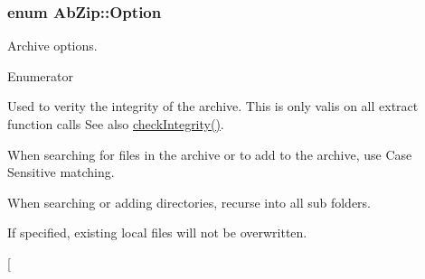 \subsubsection[{\texorpdfstring{Option}{Option}}]{\setlength{\rightskip}{0pt plus 5cm}enum {\bf Ab\+Zip\+::\+Option}}\hypertarget{class_ab_zip_a9c4f57d6b8d9a449c2eb6c4d4e53c9d5}{}\label{class_ab_zip_a9c4f57d6b8d9a449c2eb6c4d4e53c9d5}


Archive options. 

\begin{Desc}
\item[Enumerator]\par
\begin{description}
\item[{\em 
Verify\+Only\hypertarget{class_ab_zip_a9c4f57d6b8d9a449c2eb6c4d4e53c9d5aecc21ef1487642e3109d04d1a195010a}{}\label{class_ab_zip_a9c4f57d6b8d9a449c2eb6c4d4e53c9d5aecc21ef1487642e3109d04d1a195010a}
}]Used to verity the integrity of the archive. This is only valis on all \textquotesingle{}extract\textquotesingle{} function calls See also \hyperlink{class_ab_zip_a783167f4c5f87551d7e2dc54b2beea3f}{check\+Integrity()}. \item[{\em 
Case\+Sensitive\hypertarget{class_ab_zip_a9c4f57d6b8d9a449c2eb6c4d4e53c9d5a257e58b9099305375be6f8cf0cae3cef}{}\label{class_ab_zip_a9c4f57d6b8d9a449c2eb6c4d4e53c9d5a257e58b9099305375be6f8cf0cae3cef}
}]When searching for files in the archive or to add to the archive, use Case Sensitive matching. \item[{\em 
Recursive\hypertarget{class_ab_zip_a9c4f57d6b8d9a449c2eb6c4d4e53c9d5a23555db8b40ecaf3966a205023b515e3}{}\label{class_ab_zip_a9c4f57d6b8d9a449c2eb6c4d4e53c9d5a23555db8b40ecaf3966a205023b515e3}
}]When searching or adding directories, recurse into all sub folders. \item[{\em 
Dont\+Overwrite\hypertarget{class_ab_zip_a9c4f57d6b8d9a449c2eb6c4d4e53c9d5afe12bba10bd24a3bf1da93500fd5c401}{}\label{class_ab_zip_a9c4f57d6b8d9a449c2eb6c4d4e53c9d5afe12bba10bd24a3bf1da93500fd5c401}
}]If specified, existing local files will not be overwritten. \item[{\em 
}
\end{description}
\end{Desc}
